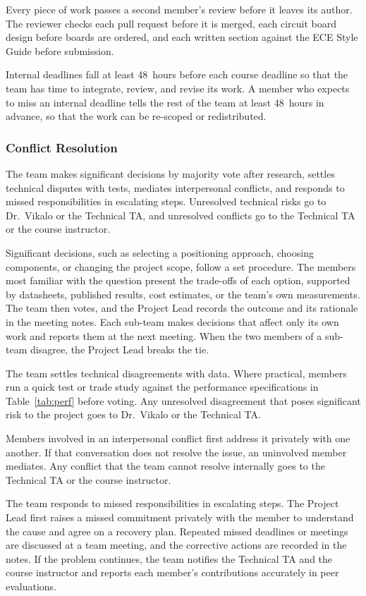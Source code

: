 \documentclass[12pt,letterpaper]{article}
\begin{document}
Every piece of work passes a second member's review before it leaves its author. The reviewer checks
each pull request before it is merged, each circuit board design before boards are ordered, and each
written section against the ECE Style Guide before submission.

Internal deadlines fall at least 48~hours before each course deadline so that the team has time to
integrate, review, and revise its work. A member who expects to miss an internal deadline tells the
rest of the team at least 48~hours in advance, so that the work can be re-scoped or redistributed.

\subsubsection{Conflict Resolution}
The team makes significant decisions by majority vote after research, settles technical disputes
with tests, mediates interpersonal conflicts, and responds to missed responsibilities in escalating
steps. Unresolved technical risks go to Dr.\ Vikalo or the Technical TA, and unresolved conflicts go
to the Technical TA or the course instructor.

Significant decisions, such as selecting a positioning approach, choosing components, or changing
the project scope, follow a set procedure. The members most familiar with the question present the
trade-offs of each option, supported by datasheets, published results, cost estimates, or the
team's own measurements. The team then votes, and the Project Lead records the outcome and its
rationale in the meeting notes. Each sub-team makes decisions that affect only its own work and
reports them at the next meeting. When the two members of a sub-team disagree, the Project Lead
breaks the tie.

The team settles technical disagreements with data. Where practical, members run a quick test or
trade study against the performance specifications in Table~\ref{tab:perf} before voting. Any
unresolved disagreement that poses significant risk to the project goes to Dr.\ Vikalo or the
Technical TA.

Members involved in an interpersonal conflict first address it privately with one another. If that
conversation does not resolve the issue, an uninvolved member mediates. Any conflict that the team
cannot resolve internally goes to the Technical TA or the course instructor.

The team responds to missed responsibilities in escalating steps. The Project Lead first raises a
missed commitment privately with the member to understand the cause and agree on a recovery plan.
Repeated missed deadlines or meetings are discussed at a team meeting, and the corrective actions are
recorded in the notes. If the problem continues, the team notifies the Technical TA and the course
instructor and reports each member's contributions accurately in peer evaluations.
\end{document}
